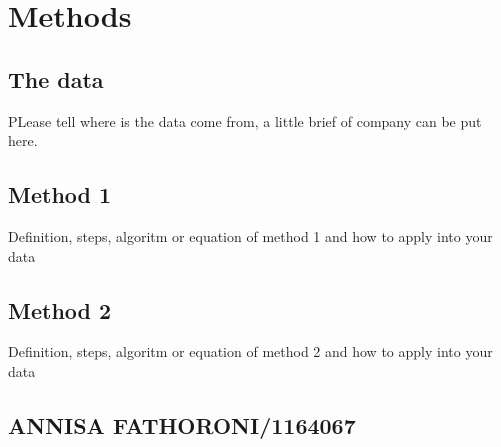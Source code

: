 \chapter{Methods}

\section{The data}
PLease tell where is the data come from, a little brief of company can be put here.

\section{Method 1}
Definition, steps, algoritm or equation of method 1 and how to apply into your data
\section{Method 2}
Definition, steps, algoritm or equation of method 2 and how to apply into your data

\section{ANNISA FATHORONI/1164067}
